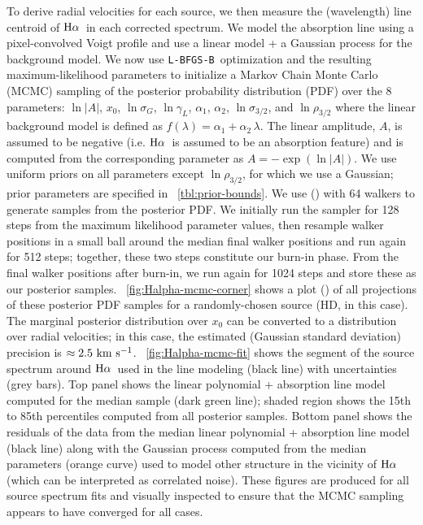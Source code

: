 \documentclass[modern, letterpaper]{aastex61}
\newcommand{\lbfgsb}{\texttt{L-BFGS-B}}
\newcommand{\Ha}{\ensuremath{{\rm H}\alpha}}
\begin{document}
To derive radial velocities for each source, we then measure the (wavelength)
line centroid of \Ha\ in each corrected spectrum.
We model the absorption line using a pixel-convolved Voigt profile and use a
linear model + a Gaussian process for the background model.
We now use \lbfgsb\ optimization and the resulting maximum-likelihood parameters
to initialize a Markov Chain Monte Carlo (MCMC) sampling of the posterior
probability distribution (PDF) over the 8 parameters: $\ln |A|$, $x_0$,
$\ln\sigma_G$, $\ln\gamma_L$, $\alpha_1$, $\alpha_2$, $\ln\sigma_{3/2}$, and
$\ln\rho_{3/2}$ where the linear background model is defined as $f(\lambda) =
\alpha_1 + \alpha_2\,\lambda$.
The linear amplitude, $A$, is assumed to be negative (i.e. \Ha\ is assumed to be
an absorption feature) and is computed from the corresponding parameter as $A =
-\exp(\ln |A|)$.
We use uniform priors on all parameters except $\ln\rho_{3/2}$, for which we use
a Gaussian; prior parameters are specified in \tablename~\ref{tbl:prior-bounds}.
We use  (\citealt{Foreman-Mackey:2013}) with 64 walkers to
generate samples from the posterior PDF.
We initially run the sampler for 128 steps from the maximum likelihood parameter
values, then resample walker positions in a small ball around the median final
walker positions and run again for 512 steps; together, these two steps
constitute our burn-in phase.
From the final walker positions after burn-in, we run again for 1024 steps and
store these as our posterior samples.
\figurename~\ref{fig:Halpha-mcmc-corner} shows a  plot
(\citealt{Foreman-Mackey:2016}) of all projections of these posterior PDF
samples for a randomly-chosen source (HD, in this case).
The marginal posterior distribution over $x_0$ can be converted to a
distribution over radial velocities; in this case, the estimated (Gaussian
standard deviation) precision is $\approx 2.5~\mathrm{km}~\mathrm{s}^{-1}$.
\figurename~\ref{fig:Halpha-mcmc-fit} shows the segment of the source spectrum
around \Ha\ used in the line modeling (black line) with uncertainties (grey
bars).
Top panel shows the linear polynomial + absorption line model computed for the
median sample (dark green line); shaded region shows the 15th to 85th
percentiles computed from all posterior samples.
Bottom panel shows the residuals of the data from the median linear polynomial +
absorption line model (black line) along with the Gaussian process computed from
the median parameters (orange curve) used to model other structure in the
vicinity of \Ha (which can be interpreted as correlated noise).
These figures are produced for all source spectrum fits and visually inspected
to ensure that the MCMC sampling appears to have converged for all cases.
\end{document}
